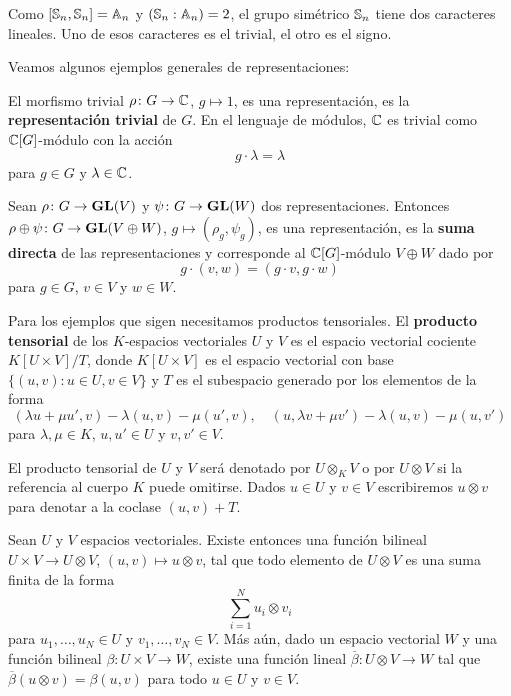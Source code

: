 \begin{example}
Como $[\mathbb{S}_n,\mathbb{S}_n]=\mathbb{A}_n$ y $(\mathbb{S}_n:\mathbb{A}_n)=2$, el grupo 
simétrico $\mathbb{S}_n$ tiene dos caracteres lineales. Uno de esos caracteres es el trivial, el otro es el signo. 
\end{example}

Veamos algunos ejemplos generales de representaciones:

\begin{example}
    El morfismo trivial $\rho\colon G\to\mathbb{C}$, $g\mapsto 1$, es una representación, 
    es la \textbf{representación trivial} de $G$. En el lenguaje de módulos, 
	$\mathbb{C}$ es trivial como $\mathbb{C}[G]$-módulo con la acción
	\[
	g\cdot \lambda=\lambda
	\]
	para $g\in G$ y $\lambda\in\mathbb{C}$.
\end{example}

\begin{example}
  Sean $\rho\colon G\to\mathbf{GL}(V)$ y $\psi\colon G\to\mathbf{GL}(W)$ dos representaciones.
  Entonces $\rho\oplus\psi\colon G\to\mathbf{GL}(V\oplus W)$, $g\mapsto (\rho_g,\psi_g)$, 
  es una representación, es la 
  \textbf{suma directa} de las representaciones y corresponde al $\mathbb{C}[G]$-módulo 
  $V\oplus W$ dado por 
  \[
  g\cdot (v,w)=(g\cdot v,g\cdot w)
  \]
  para $g\in G$, $v\in V$ y $w\in W$. 
\end{example}

Para los ejemplos que sigen 
necesitamos productos tensoriales. 
El \textbf{producto tensorial} de los $K$-espacios vectoriales $U$ y $V$ es
el espacio vectorial cociente $K[U\times V]/T$, donde $K[U\times V]$ es el
espacio vectorial con base $\{(u,v):u\in U,v\in V\}$ y $T$ es el subespacio
generado por los elementos de la forma
	\[
		(\lambda u+\mu u',v)-\lambda(u,v)-\mu(u',v),\quad
		(u,\lambda v+\mu v')-\lambda(u,v)-\mu(u,v')
	\]
	para $\lambda,\mu\in K$, $u,u'\in U$ y $v,v'\in V$.

El producto tensorial de $U$ y $V$ será denotado por $U\otimes_KV$ o por
$U\otimes V$ si la referencia al cuerpo $K$ puede omitirse. Dados $u\in U$
y $v\in V$ escribiremos $u\otimes v$ para denotar a la coclase $(u,v)+T$.

\begin{theorem}
	Sean $U$ y $V$ espacios vectoriales.  Existe entonces una función bilineal
	$U\times V\to U\otimes V$, $(u,v)\mapsto u\otimes v$, tal que todo
	elemento de $U\otimes V$ es una suma finita de la forma
	\[
		\sum_{i=1}^N u_i\otimes v_i
	\]
	para $u_1,\dots,u_N\in U$ y $v_1,\dots,v_N\in V$. 
	Más aún, dado un espacio vectorial $W$ y una función
	bilineal $\beta\colon U\times V\to W$, existe una función lineal
	$\overline{\beta}\colon U\otimes V\to W$ tal que $\overline{\beta}(u\otimes
	v)=\beta(u,v)$ para todo $u\in U$ y $v\in V$.
\end{theorem}

